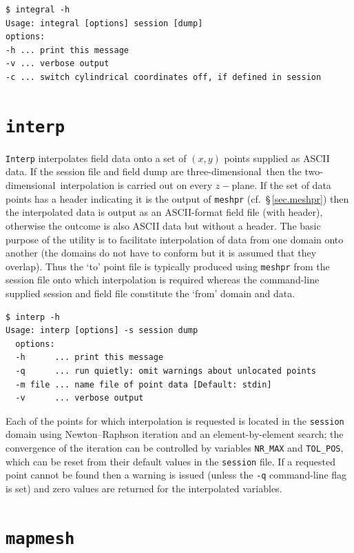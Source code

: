\documentclass[11pt]{report}
\newcommand\twod{two-di\-men\-sion\-al}
\newcommand\threed{three-di\-men\-sion\-al}
\begin{document}
{\small
\begin{verbatim}
$ integral -h
Usage: integral [options] session [dump]
options:
-h ... print this message
-v ... verbose output
-c ... switch cylindrical coordinates off, if defined in session
\end{verbatim}
}
%

\section{\texttt{interp}}
\label{sec.intero}

\verb|Interp| interpolates field data onto a set of $(x,y)$ points
supplied as ASCII data. If the session file and field dump are
\threed\ then the \twod\ interpolation is carried out on every
$z-$plane.  If the set of data points has a header indicating it is
the output of \verb|meshpr| (cf.\ \S\,\ref{sec.meshpr}) then the
interpolated data is output as an ASCII-format field file (with
header), otherwise the outcome is also ASCII data but without a
header.  The basic purpose of the utility is to facilitate
interpolation of data from one domain onto another (the domains do not
have to conform but it is assumed that they overlap).  Thus the `to'
point file is typically produced using \verb|meshpr| from the session
file onto which interpolation is required whereas the command-line
supplied session and field file constitute the `from' domain and
data.
%
{\small
\begin{verbatim}
$ interp -h
Usage: interp [options] -s session dump
  options:
  -h      ... print this message
  -q      ... run quietly: omit warnings about unlocated points
  -m file ... name file of point data [Default: stdin]
  -v      ... verbose output
\end{verbatim}
}
%
Each of the points for which interpolation is requested is located in
the \verb|session| domain using Newton--Raphson iteration and an
element-by-element search; the convergence of the iteration can be
controlled by variables \verb|NR_MAX| and \verb|TOL_POS|, which can be
reset from their default values in the \verb|session| file.  If a
requested point cannot be found then a warning is issued (unless the
\verb|-q| command-line flag is set) and zero values are returned for
the interpolated variables.

\section{\texttt{mapmesh}}
\label{sec.mapmesh}
\end{document}
